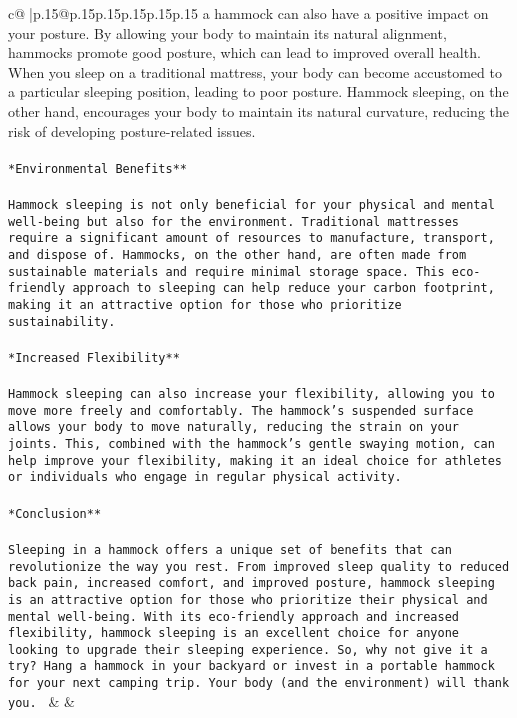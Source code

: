 \documentclass{article}
\begin{document}
{\begin{supertabular}{c@{$\;$}|p{.15\linewidth}@{}p{.15\linewidth}p{.15\linewidth}p{.15\linewidth}p{.15\linewidth}p{.15\linewidth}}
{{{a hammock can also have a positive impact on your posture. By allowing your body to maintain its natural alignment, hammocks promote good posture, which can lead to improved overall health. When you sleep on a traditional mattress, your body can become accustomed to a particular sleeping position, leading to poor posture. Hammock sleeping, on the other hand, encourages your body to maintain its natural curvature, reducing the risk of developing posture-related issues.\\ \tt \\ \tt **Environmental Benefits**\\ \tt \\ \tt Hammock sleeping is not only beneficial for your physical and mental well-being but also for the environment. Traditional mattresses require a significant amount of resources to manufacture, transport, and dispose of. Hammocks, on the other hand, are often made from sustainable materials and require minimal storage space. This eco-friendly approach to sleeping can help reduce your carbon footprint, making it an attractive option for those who prioritize sustainability.\\ \tt \\ \tt **Increased Flexibility**\\ \tt \\ \tt Hammock sleeping can also increase your flexibility, allowing you to move more freely and comfortably. The hammock's suspended surface allows your body to move naturally, reducing the strain on your joints. This, combined with the hammock's gentle swaying motion, can help improve your flexibility, making it an ideal choice for athletes or individuals who engage in regular physical activity.\\ \tt \\ \tt **Conclusion**\\ \tt \\ \tt Sleeping in a hammock offers a unique set of benefits that can revolutionize the way you rest. From improved sleep quality to reduced back pain, increased comfort, and improved posture, hammock sleeping is an attractive option for those who prioritize their physical and mental well-being. With its eco-friendly approach and increased flexibility, hammock sleeping is an excellent choice for anyone looking to upgrade their sleeping experience. So, why not give it a try? Hang a hammock in your backyard or invest in a portable hammock for your next camping trip. Your body (and the environment) will thank you. 
	  } 
	   } 
	   } 
	 & & \\ 
 


\end{supertabular}}
\end{document}
